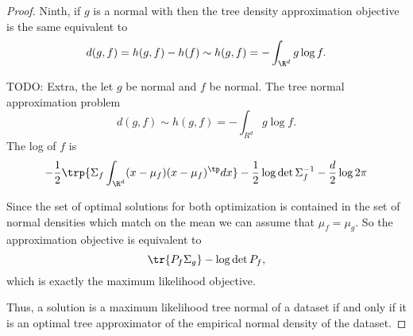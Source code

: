 \begin{prop}
\begin{proof}
Ninth, if $g$ is a normal with then the tree density approximation objective is the same equivalent to
$$
  d(g, f) = h(g, f) - h(f) \sim h(g, f) = - \int_{\R^d} g\log f.
$$

TODO:
Extra, the let $g$ be normal and $f$ be normal. The tree normal approximation problem
$$
  d(g, f) \sim h(g, f) = - \int_{R^d} g \log f.
$$
The log of $f$ is
$$
  - \frac{1}{2} \trp{ \Sigma_f \int_{\R^d} (x - \mu_f)(x - \mu_f)^{\tp} dx } - \frac{1}{2} \log \det \Sigma_f^{-1} - \frac{d}{2} \log 2\pi
$$

Since the set of optimal solutions for both optimization is contained in the set of normal densities which match on the mean we can assume that $\mu_f = \mu_g$.
So the approximation objective is equivalent to
$$
  \tr{P_f \Sigma_g} - \log \det P_f,
$$
which is exactly the maximum likelihood objective.

Thus, a solution is a maximum likelihood tree normal of a dataset if and only if it is an optimal tree approximator of the empirical normal density of the dataset.

\end{proof}

\end{prop}
\strats
